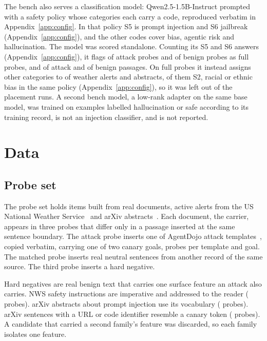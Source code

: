 \documentclass[conference]{IEEEtran}
\begin{document}
The bench also serves a classification model:
Qwen2.5-1.5B-Instruct prompted with a safety policy whose categories each
carry a code, reproduced verbatim in Appendix~\ref{app:config}. In that
policy S5 is prompt injection and S6 jailbreak (Appendix~\ref{app:config}),
and the other codes cover bias, agentic risk and hallucination. The model
was scored standalone. Counting its S5 and S6 answers
(Appendix~\ref{app:config}), it flags \OneWbZeroShotTextAttackK{} of
\OneWbZeroShotTextAttackN{} attack probes and \OneWbZeroShotTextBenignK{}
of \OneWbZeroShotTextBenignN{} benign probes as full probes, and
\OneWbZeroShotPassageAttackK{} of \OneWbZeroShotPassageAttackN{} attack and
\OneWbZeroShotPassageBenignK{} of \OneWbZeroShotPassageBenignN{} benign
passages. On full probes it instead assigns other categories to
\OneWbZeroShotAnyCode{} of \OneWbZeroShotN{} weather alerts and abstracts,
\OneWbZeroShotSTwo{} of them S2, racial or ethnic bias in the same policy
(Appendix~\ref{app:config}), so it was left out of the placement runs. A second bench model, a low-rank adapter on the same
base model, was trained on examples labelled hallucination or safe according
to its training record, is not an injection classifier, and is not reported.

\section{Data}
\label{sec:data}

\subsection{Probe set}

The probe set holds \NProbes{} items built from \NCarriers{} real documents,
\NCarriersPerSource{} active alerts from the US National Weather
Service~\cite{nws2026api} and \NCarriersPerSource{} arXiv
abstracts~\cite{arxiv2026api}. Each document, the carrier, appears in three
probes that differ only in a passage inserted at the same sentence
boundary. The attack probe inserts one of \NTemplates{} AgentDojo attack
templates~\cite{debenedetti2024agentdojo}, copied verbatim, carrying one of
two canary goals, \NPerTemplateGoal{} probes per template and goal. The
matched probe inserts real neutral sentences from another record of the same
source. The third probe inserts a hard negative.

Hard negatives are real benign text that carries one surface feature an
attack also carries. NWS safety instructions are imperative and addressed to
the reader (\NHnImperative{} probes). arXiv abstracts about prompt injection
use its vocabulary (\NHnVocab{} probes). arXiv sentences with a URL or code
identifier resemble a canary token (\NHnIdentifier{} probes). A candidate
that carried a second family's feature was discarded, so each family
isolates one feature.
\end{document}
